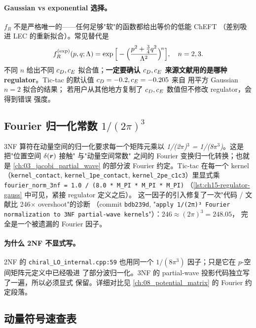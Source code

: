 \paragraph{Gaussian vs exponential 选择。}
\(f_R\) 不是严格唯一的——任何足够"软"的函数都给出等价的低能 ChEFT
（差别吸进 LEC 的重新拟合）。常见替代是
\begin{equation}
f_R^{(\rm exp)}(p, q; \Lambda) = \exp\Big[ -\Big(\frac{p^2 + \tfrac{3}{4} q^2}{\Lambda^2}\Big)^{\!n} \Big],
\quad n = 2, 3.
\end{equation}
不同 \(n\) 给出不同 \(c_D, c_E\) 拟合值；\textbf{一定要确认 \(c_D, c_E\)
来源文献用的是哪种 regulator}。Tic-tac 的默认值 \(c_D = -0.2, c_E = -0.205\)
来自 \cite{Epelbaum2002NLO3NF} 用平方 Gaussian \(n = 2\) 拟合的结果；
若用户从其他地方复制了 \(c_D, c_E\) 数值但不修改 regulator，会得到错误
强度。

\subsection{Fourier 归一化常数 \(1/(2\pi)^3\)}
\label{subsec:ch15-fourier-norm}

3NF 算符在动量空间的归一化要求每一个矩阵元乘以 \emph{1/(2\(\pi\))\(^3\) =
1/(8\(\pi^3\))}。这是把"位置空间 \(\delta(\bm{r})\) 接触" 与"动量空间常数"
之间的 Fourier 变换归一化转换；也就是 \cref{ch:03_jacobi_partial_wave}
的部分波 Fourier 约定。Tic-tac 在每一个 kernel（\texttt{kernel\_contact},
\texttt{kernel\_1pe\_contact}, \texttt{kernel\_2pe\_c1c3}）里显式乘
\texttt{fourier\_norm\_3nf = 1.0 / (8.0 * M\_PI * M\_PI * M\_PI)}
（\cref{lst:ch15-regulator-gauss} 中可见，紧接 regulator 定义之后）。
这一因子的引入修复了一次"代码 / 文献比 246× overshoot"的诊断
（commit \texttt{bdb239d}, "\texttt{apply 1/(2π)³ Fourier normalization
to 3NF partial-wave kernels}"）：\(246 \approx (2\pi)^3 = 248.05\)，
完全是一个被遗漏的 Fourier 因子。

\paragraph{为什么 2NF 不显式写。} 2NF 的 \texttt{chiral\_LO\_internal.cpp:59}
也用同一个 \(1/(8\pi^3)\) 因子；只是它在 \(p\)-空间矩阵元定义中已经吸进
了部分波归一化。3NF 的 partial-wave 投影代码独立写了一遍，所以必须显式
保留。详细对比见 \cref{ch:08_potential_matrix} 的 Fourier 约定段落。

\subsection{动量符号速查表}
\label{subsec:ch15-momentum-cheatsheet}

